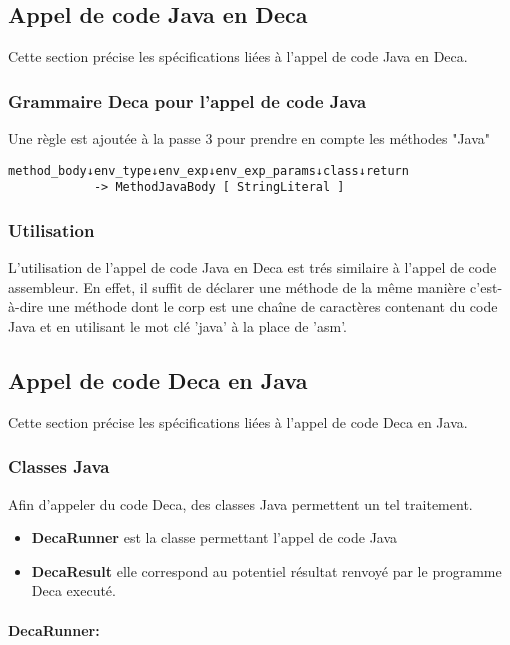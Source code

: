 \documentclass[12pt, a4paper, one side]{article}
\newcommand{\paragraphln}[1]{\paragraph{#1}\mbox{}\\}
\begin{document}
    \subsection{Appel de code Java en Deca}
    Cette section précise les spécifications liées à l'appel de code Java en Deca.
        \subsubsection{Grammaire Deca pour l'appel de code Java}
        Une règle est ajoutée à la passe 3 pour prendre en compte les méthodes "Java"
\begin{lstlisting}
method_body↓env_type↓env_exp↓env_exp_params↓class↓return
            -> MethodJavaBody [ StringLiteral ]
\end{lstlisting}

        \subsubsection{Utilisation}
        L'utilisation de l'appel de code Java en Deca est trés similaire à l'appel de code assembleur. En effet, il suffit de déclarer une méthode de la même manière c'est-à-dire une méthode dont le corp est une chaîne de caractères contenant du code Java et en utilisant le mot clé 'java' à la place de 'asm'.

    \subsection{Appel de code Deca en Java}
    Cette section précise les spécifications liées à l'appel de code Deca en Java.
    \lstset{style=mystyle}

        \subsubsection{Classes Java}
        Afin d'appeler du code Deca, des classes Java permettent un tel traitement.

        \begin{itemize}
            \item \textbf{DecaRunner} est la classe permettant l'appel de code Java
            \item \textbf{DecaResult} elle correspond au potentiel résultat renvoyé par le programme Deca executé.
        \end{itemize}

        \paragraphln{DecaRunner:}
\end{document}
